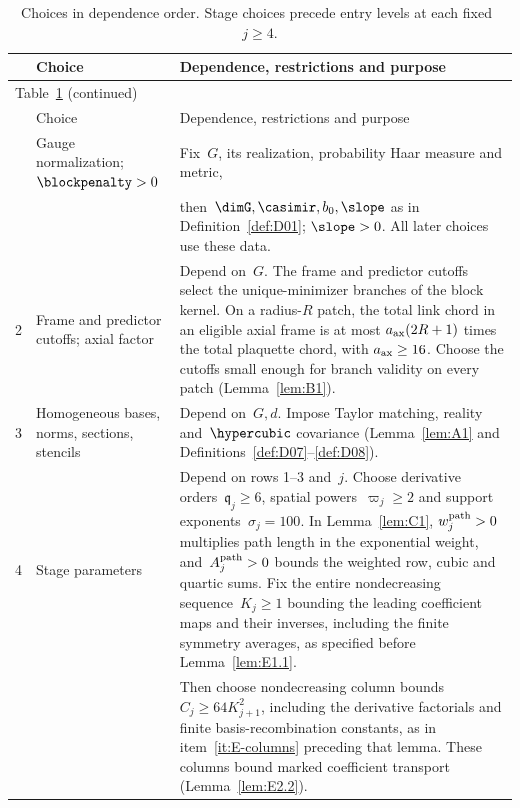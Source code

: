 \begin{longtable}{@{}p{}p{}p{}@{}}
\caption{Choices in dependence order. Stage choices precede entry levels at each fixed~$j\ge4$.}\label{tab:constant-choices}\\
\hline
 & Choice & Dependence, restrictions and purpose \\
\hline
\endfirsthead
\multicolumn{3}{l}{Table~\ref{tab:constant-choices} (continued)}\\
\hline
 & Choice & Dependence, restrictions and purpose \\
\hline
\endhead
\hline
\endfoot
1 & \raggedright Gauge normalization;\newline $\blockpenalty>0$ & Fix~$G$, its realization, probability Haar measure and metric,\\[3pt]
 & & then~$\dimG,\casimir,b_0,\slope$ as in Definition~\ref{def:D01}; $\slope>0$. All later choices use these data.\\[3pt]
2 & \raggedright Frame and predictor cutoffs; axial factor & Depend on~$G$. The frame and predictor cutoffs select the unique-minimizer branches of the block kernel. On a radius-$R$ patch, the total link chord in an eligible axial frame is at most $a_{\rm ax}(2R+1)$ times the total plaquette chord, with $a_{\rm ax}\ge16$. Choose the cutoffs small enough for branch validity on every patch (Lemma~\ref{lem:B1}).\\[3pt]
3 & \raggedright Homogeneous bases, norms, sections, stencils & Depend on~$G,d$. Impose Taylor matching, reality and~$\hypercubic$ covariance (Lemma~\ref{lem:A1} and Definitions~\ref{def:D07}--\ref{def:D08}).\\[3pt]
4 & \raggedright Stage parameters & Depend on rows 1--3 and~$j$. Choose derivative orders~$\mathfrak q_j\ge6$, spatial powers~$\varpi_j\ge2$ and support exponents~$\sigma_j=100$. In Lemma~\ref{lem:C1}, $w_j^{\rm path}>0$ multiplies path length in the exponential weight, and~$A_j^{\rm path}>0$ bounds the weighted row, cubic and quartic sums. Fix the entire nondecreasing sequence~$K_j\ge1$ bounding the leading coefficient maps and their inverses, including the finite symmetry averages, as specified before Lemma~\ref{lem:E1.1}.\\[3pt]
 & & Then choose nondecreasing column bounds~$C_j\ge64K_{j+1}^2$, including the derivative factorials and finite basis-recombination constants, as in item~\ref{it:E-columns} preceding that lemma. These columns bound marked coefficient transport (Lemma~\ref{lem:E2.2}).\\[3pt]

\end{longtable}
